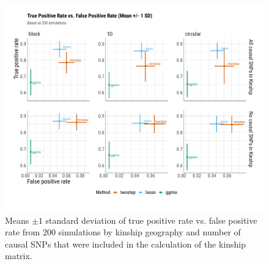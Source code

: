 \documentclass[12pt,letter]{article}\usepackage[]{graphicx}\usepackage[]{color}
\newenvironment{knitrout}{}{} %
\begin{document}
\begin{knitrout}\scriptsize
{}\color{fgcolor}\begin{figure}[H]

{\centering \includegraphics[width=1\linewidth]{figure/plot-tpr-fpr-sim-1} 

}

\caption[Means $\pm 1$ standard deviation of true positive rate vs]{Means $\pm 1$ standard deviation of true positive rate vs. false positive rate from 200 simulations by kinship geography and number of causal SNPs that were included in the calculation of the kinship matrix.}\label{fig:plot-tpr-fpr-sim}
\end{figure}


\end{knitrout}
\end{document}

